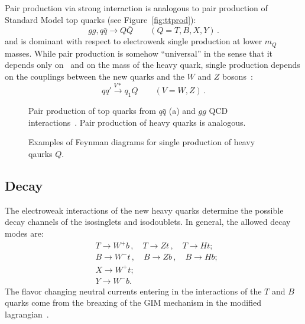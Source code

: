 Pair production via strong interaction is analogous to
pair production of Standard Model top quarks 
(see Figure~\ref{fig:ttprod}):
\begin{equation}
gg,q \bar q \to Q \bar Q \quad\quad (Q=T,B,X,Y) \,.
\end{equation}
and is dominant with respect to electroweak single
production at lower $m_Q$ masses. While pair production
is somehow ``universal'' in the sense that it depends only
on \alphas\ and on the mass of the heavy quark,
single production depends on the couplings between
the new quarks and the $W$ and $Z$ bosons~\cite{Aguilar-Saavedra:2013qpa,Atre:2011ae}:
\begin{equation}
q q' \xrightarrow{V*} q_1Q \quad\quad (V=W,Z) \,.
\end{equation}



\begin{figure}[htb]\begin{center}
	\caption{Pair production of top quarks from $q\bar{q}$ (a) 
          and $gg$ QCD interactions~\cite{Kidonakis:2011ca}. Pair
          production of heavy quarks is analogous.\label{fig:ttprod}}
\myskip
        
        \caption{Examples of Feynman diagrams for single production of heavy qaurks $Q$.\label{fig:singleprod}}
\end{center}\end{figure}


\subsection{Decay}\label{sec:vlqdecay}

The electroweak interactions of the new heavy
quarks determine the possible decay channels of
the isosinglets and isodoublets.
In general, the allowed decay modes are:
\begin{align}
& T \to W^+ b \,, \quad T \to Zt \,,\quad T \to Ht;\label{eq:vltdec}\\
& B \to W^- t \,, \quad B \to Zb \,,\quad B \to Hb;\label{eq:vlbdec}\\
& X \to W^+ t;\\
& Y \to W^- b.
\end{align}
The flavor changing neutral currents entering in the
interactions of the $T$ and $B$ quarks come from the
breaxing of the GIM mechanism in the modified 
lagrangian~\cite{AguilarSaavedra:2009es}.

